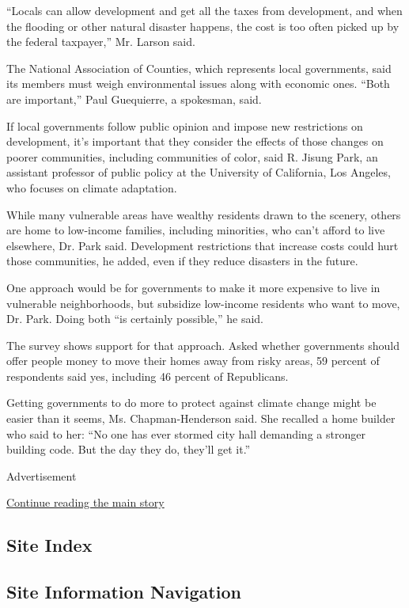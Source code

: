 ``Locals can allow development and get all the taxes from development,
and when the flooding or other natural disaster happens, the cost is too
often picked up by the federal taxpayer,'' Mr. Larson said.

The National Association of Counties, which represents local
governments, said its members must weigh environmental issues along with
economic ones. ``Both are important,'' Paul Guequierre, a spokesman,
said.

If local governments follow public opinion and impose new restrictions
on development, it's important that they consider the effects of those
changes on poorer communities, including communities of color, said R.
Jisung Park, an assistant professor of public policy at the University
of California, Los Angeles, who focuses on climate adaptation.

While many vulnerable areas have wealthy residents drawn to the scenery,
others are home to low-income families, including minorities, who can't
afford to live elsewhere, Dr. Park said. Development restrictions that
increase costs could hurt those communities, he added, even if they
reduce disasters in the future.

One approach would be for governments to make it more expensive to live
in vulnerable neighborhoods, but subsidize low-income residents who want
to move, Dr. Park. Doing both ``is certainly possible,'' he said.

The survey shows support for that approach. Asked whether governments
should offer people money to move their homes away from risky areas, 59
percent of respondents said yes, including 46 percent of Republicans.

Getting governments to do more to protect against climate change might
be easier than it seems, Ms. Chapman-Henderson said. She recalled a home
builder who said to her: ``No one has ever stormed city hall demanding a
stronger building code. But the day they do, they'll get it.''

Advertisement

\protect\hyperlink{after-bottom}{Continue reading the main story}

\hypertarget{site-index}{%
\subsection{Site Index}\label{site-index}}

\hypertarget{site-information-navigation}{%
\subsection{Site Information
Navigation}\label{site-information-navigation}}

